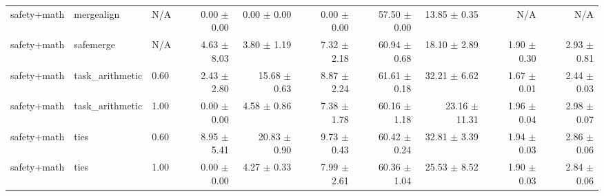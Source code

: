 \documentclass{article}
\begin{document}
\begin{table}[H]
{\begin{tabular}{lllrrrrrrr}
safety+math & mergealign & N/A & 0.00 $\pm$ 0.00 & 0.00 $\pm$ 0.00 & 0.00 $\pm$ 0.00 & 57.50 $\pm$ 0.00 & 13.85 $\pm$ 0.35 & N/A & N/A \\
safety+math & safemerge & N/A & 4.63 $\pm$ 8.03 & 3.80 $\pm$ 1.19 & 7.32 $\pm$ 2.18 & 60.94 $\pm$ 0.68 & 18.10 $\pm$ 2.89 & 1.90 $\pm$ 0.30 & 2.93 $\pm$ 0.81 \\
safety+math & task\_arithmetic & 0.60 & 2.43 $\pm$ 2.80 & 15.68 $\pm$ 0.63 & 8.87 $\pm$ 2.24 & 61.61 $\pm$ 0.18 & 32.21 $\pm$ 6.62 & 1.67 $\pm$ 0.01 & 2.44 $\pm$ 0.03 \\
safety+math & task\_arithmetic & 1.00 & 0.00 $\pm$ 0.00 & 4.58 $\pm$ 0.86 & 7.38 $\pm$ 1.78 & 60.16 $\pm$ 1.18 & 23.16 $\pm$ 11.31 & 1.96 $\pm$ 0.04 & 2.98 $\pm$ 0.07 \\
safety+math & ties & 0.60 & 8.95 $\pm$ 5.41 & 20.83 $\pm$ 0.90 & 9.73 $\pm$ 0.43 & 60.42 $\pm$ 0.24 & 32.81 $\pm$ 3.39 & 1.94 $\pm$ 0.03 & 2.86 $\pm$ 0.06 \\
safety+math & ties & 1.00 & 0.00 $\pm$ 0.00 & 4.27 $\pm$ 0.33 & 7.99 $\pm$ 2.61 & 60.36 $\pm$ 1.04 & 25.53 $\pm$ 8.52 & 1.90 $\pm$ 0.03 & 2.84 $\pm$ 0.06 \\
\bottomrule
\end{tabular}
}
\end{table}


\begin{table}[H]
\centering
\caption{メイン実験 シード別詳細 - Method: diagonal\_sst\_main, Pattern: safety+math}
\label{tab:main_seeds_diagonalsstmain_safety_math}
\small
{}
\end{table}
\end{document}
